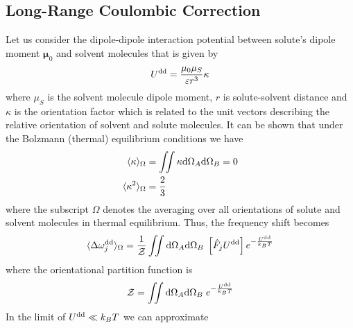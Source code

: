 \documentclass[a4paper,titlepage,twoside,fleqn,12pt]{book}
\newcommand{\BM}[1]{\bm{#1}}
\begin{document}
\begin{refsection}

\subsection{Long\hyp{}Range Coulombic Correction}

Let us consider the dipole\hyp{}dipole interaction
potential between solute's dipole moment ${\BM \mu}_0$ 
and solvent molecules that is given by 
%
\begin{equation}
 U^{\rm dd} = \frac{\mu_0\mu_S}{\varepsilon r^3} \kappa
\end{equation}
%
where $\mu_S$ is the solvent molecule dipole moment, 
$r$ is solute\hyp{}solvent distance 
and $\kappa$ is the orientation factor which is related
to the unit vectors describing the relative orientation
of solvent and solute molecules. 
It can be shown that 
under the Bolzmann (thermal) equilibrium conditions we have
%
\begin{subequations}
\begin{align} \label{e:73626}
 \langle \kappa \rangle_{\Omega} &= \iint \kappa {\rm d}\Omega_A{\rm d}\Omega_B  = 0 \\
 \langle \kappa^2 \rangle_{\Omega} &= \frac{2}{3}
\end{align}
\end{subequations}
%
where the subscript
$\Omega$ denotes the averaging over all orientations of 
solute and solvent molecules in thermal equilibrium. \citep{London.TransFaradSoc.1937}
Thus, the frequency shift becomes
%
\begin{equation}
 \langle \Delta \omega_j^{\rm dd} \rangle_{\Omega} = 
\frac{1}{\mathcal{Z}} 
\iint {\rm d}\Omega_A{\rm d}\Omega_B \; \left[\hat{F}_j U^{\rm dd}\right] e^{-\frac{U^{\rm dd}}{k_BT}} 
\end{equation}
%
where the orientational 
partition function is
%
\begin{equation}
\mathcal{Z} =
\iint {\rm d}\Omega_A{\rm d}\Omega_B \; e^{-\frac{U^{\rm dd}}{k_BT}}
\end{equation}
%
In the limit of $U^{\rm dd}\ll k_BT$ we can approximate 

\end{refsection}
\end{document}
